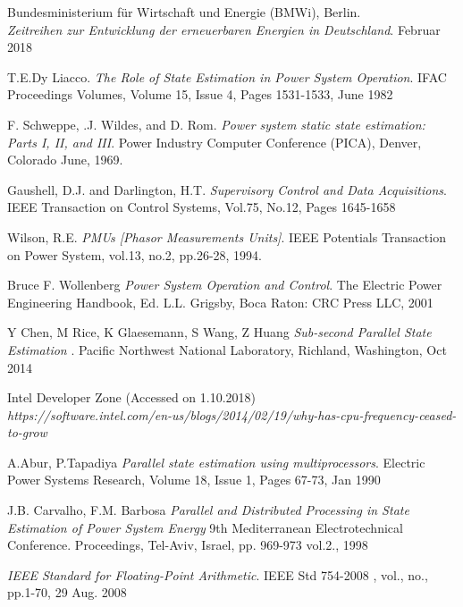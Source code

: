 \documentclass[fontsize=12pt, paper=a4, headinclude, twoside=false, parskip=half+, pagesize=auto, numbers=noenddot, headsepline, footsepline, open=right, toc=listof, toc=bibliography]{scrreprt}
\begin{document}

\begin{thebibliography}{9}
	
	
	Bundesministerium für Wirtschaft und Energie (BMWi), Berlin.
	\\\textit{Zeitreihen zur Entwicklung der erneuerbaren Energien in Deutschland}. 
	Februar 2018
	
	
	T.E.Dy Liacco.
	\textit{The Role of State Estimation in Power System Operation}. 
	IFAC Proceedings Volumes, Volume 15, Issue 4, Pages 1531-1533, June 1982
	
	F. Schweppe, .J. Wildes, and D. Rom. 
	\textit{Power system static state estimation: Parts I, II, and III}. 
	Power Industry Computer Conference (PICA), Denver, Colorado June, 1969.
	
	Gaushell, D.J. and Darlington, H.T.  
	\textit{Supervisory Control and Data Acquisitions}. 
	IEEE Transaction on Control Systems, Vol.75, No.12, Pages 1645-1658
	
	Wilson, R.E.  
	\textit{PMUs [Phasor Measurements Units]}. 
	IEEE Potentials Transaction on Power System, vol.13, no.2, pp.26-28, 1994.
	
	Bruce F. Wollenberg  
	\textit{Power System Operation and Control}. 
	The Electric Power Engineering Handbook, Ed. L.L. Grigsby, Boca Raton: CRC Press LLC, 2001
	
	
	Y Chen, M Rice, K Glaesemann, S Wang, Z Huang   
	\textit{Sub-second Parallel State Estimation }. 
	Pacific Northwest National Laboratory, Richland, Washington, Oct 2014
	
	Intel Developer Zone (Accessed on 1.10.2018)
	\\\textit{https://software.intel.com/en-us/blogs/2014/02/19/why-has-cpu-frequency-ceased-to-grow}
	
	
	A.Abur, P.Tapadiya  
	\textit{Parallel state estimation using multiprocessors}. 
	Electric Power Systems Research, Volume 18, Issue 1, Pages 67-73, Jan 1990
	
	
	J.B. Carvalho, F.M. Barbosa 
	\textit{Parallel and Distributed Processing in State Estimation of Power System Energy}
	9th Mediterranean Electrotechnical Conference. Proceedings, Tel-Aviv, Israel, pp. 969-973 vol.2., 1998
	
	
	
	\textit{IEEE Standard for Floating-Point Arithmetic}. 
	IEEE Std 754-2008 , vol., no., pp.1-70, 29 Aug. 2008
	

\end{thebibliography}
\end{document}
